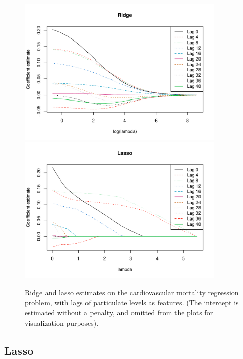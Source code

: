 \documentclass{article}
\begin{document}
\begin{itemize}
\begin{figure}[p]
\centering
\includegraphics[width=0.875\textwidth]{fig/cardio-ridge-1.pdf}
\includegraphics[width=0.875\textwidth]{fig/cardio-lasso-1.pdf}
\caption{Ridge and lasso estimates on the cardiovascular mortality regression
  problem, with lags of particulate levels as features. (The intercept is
  estimated without a penalty, and omitted from the plots for visualization 
  purposes).} 
\label{fig:cardio}
\end{figure}
\end{itemize}

\subsection{Lasso}
\end{document}
